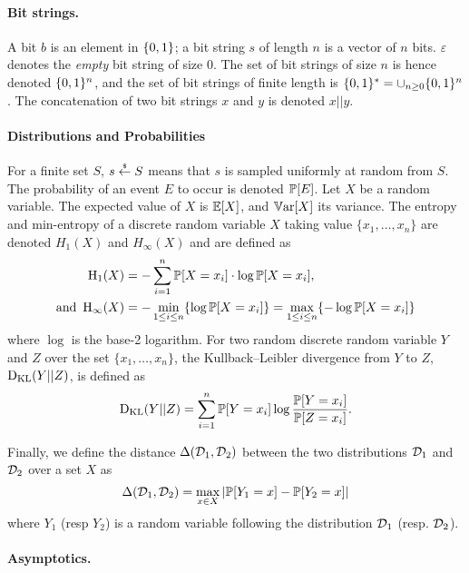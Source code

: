 \paragraph{Bit strings.} %
\label{par:def_bit_strings}


A bit $b$ is an element in $\{0,1\}$; a bit string $s$ of length $n$ is a vector of $n$ bits.
$\varepsilon$ denotes the \emph{empty} bit string of size 0. 
The set of bit strings of size $n$ is hence denoted $\{0,1\}^n$, and the set of bit strings of finite length is $\{0,1\}^* = \cup_{n \geq 0} \{0,1\}^n$.
The concatenation of two bit strings $x$ and $y$ is denoted $x||y$.



\paragraph{Distributions and Probabilities} %
\label{par:def_distrib_probas}

For a finite set $S$, $s \stackrel{\scriptscriptstyle{\$}}{\gets} S$ means that $s$ is sampled uniformly at random from $S$.
The probability of an event $E$ to occur is denoted $\operatorname*{\mathbb{P}}[E]$.
Let $X$ be a random variable. The expected value of $X$ is $\operatorname*{\mathbb{E}}[X]$, and $\operatorname*{\mathbb{V}ar}[X]$ its variance.
The entropy and min-entropy of a discrete random variable $X$ taking value $\{x_1, \dots, x_n\}$ are denoted $H_1(X)$ and $H_{\infty}(X)$ and are defined as
\begin{align*}
	\operatorname*{H_1}(X) &= - \sum_{i=1}^{n} \operatorname*{\mathbb{P}}[X = x_i] \cdot \log \operatorname*{\mathbb{P}}[X = x_i], \\
	\text{and } \operatorname*{H_{\infty}}(X) &= - \min_{1 \leq i \leq n} \{ \log \operatorname*{\mathbb{P}}[X = x_i] \} = \max_{1 \leq i \leq n} \{ - \log \operatorname*{\mathbb{P}}[X = x_i] \}
\end{align*}
where $\log$ is the base-2 logarithm.
For two random discrete random variable $Y$ and $Z$ over the set $\{x_1, \dots, x_n\}$, the  Kullback–Leibler divergence from $Y$ to $Z$, $\operatorname*{D_{KL}}(Y || Z)$, is defined as
\[
	\operatorname*{D_{KL}}(Y || Z) = \sum_{i=1}^{n} \operatorname*{\mathbb{P}}[Y = x_i] \log \frac{\operatorname*{\mathbb{P}}[Y = x_i]}{\operatorname*{\mathbb{P}}[Z = x_i]}.
\]

Finally, we define the distance $\Delta(\mathcal{D}_1, \mathcal{D}_2)$ between the two distributions $\mathcal{D}_1$ and $\mathcal{D}_2$ over a set $X$ as
\[
	\Delta(\mathcal{D}_1, \mathcal{D}_2) = \max_{x \in X} \left|\operatorname*{\mathbb{P}}[Y_1 = x] -  \operatorname*{\mathbb{P}}[Y_2 = x]\right|
\]
where $Y_1$ (resp $Y_2$) is a random variable following the distribution $\mathcal{D}_1$ (resp. $\mathcal{D}_2$).


\paragraph{Asymptotics.} %
\label{par:def_asymptotics}


